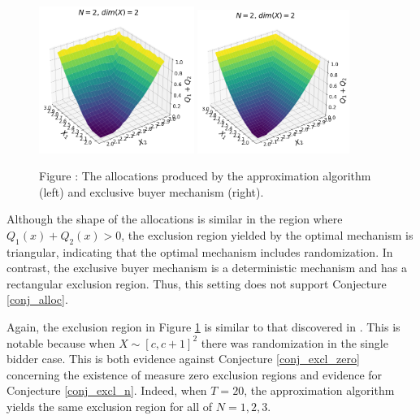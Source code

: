 \begin{figure}[H]
    \begin{center}
    \includegraphics[width=0.45\textwidth]{images/symmetric_independent_unif_23.png}
    \includegraphics[width=0.44\textwidth]{images/symmetric_independent_unif_23_ebm.png}
    \end{center}
    
    \vspace{1mm}
    \raggedright{\small {\sc Figure \thefig\label{fig:pavlov_n2_23_alloc}:} The allocations produced by the approximation algorithm (left) and exclusive buyer mechanism (right).} 
\end{figure}

\noindent Although the shape of the allocations is similar in the region where $Q_1(x) + Q_2(x) > 0$, the exclusion region yielded by the optimal mechanism is triangular, indicating that the optimal mechanism includes randomization. In contrast, the exclusive buyer mechanism is a deterministic mechanism and has a rectangular exclusion region. Thus, this setting does not support Conjecture \ref{conj_alloc}.

Again, the exclusion region in Figure \ref{fig:pavlov_n2_23_alloc} is similar to that discovered in \autocite{pavlov2011optimal}. This is notable because when $X \sim [c,c+1]^2$ there was randomization in the single bidder case. This is both evidence against Conjecture \ref{conj_excl_zero} concerning the existence of measure zero exclusion regions and evidence for Conjecture \ref{conj_excl_n}. Indeed, when $T=20$, the approximation algorithm yields the same exclusion region for all of $N=1,2,3$.





